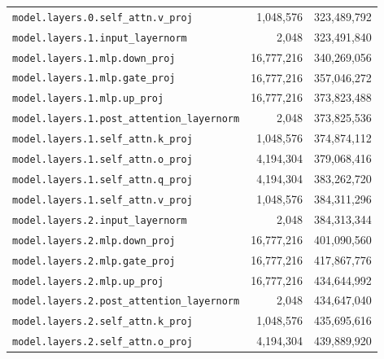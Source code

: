\documentclass[10pt,a4paper]{article}
\theoremstyle{definition}
\begin{document}
\begin{appendices}
\begin{longtable}{p{9.5cm}rr}
\texttt{model.\allowbreak{}layers.\allowbreak{}0.\allowbreak{}self\_attn.\allowbreak{}v\_proj} & 1,048,576 & 323,489,792 \\
\texttt{model.\allowbreak{}layers.\allowbreak{}1.\allowbreak{}input\_layernorm} & 2,048 & 323,491,840 \\
\texttt{model.\allowbreak{}layers.\allowbreak{}1.\allowbreak{}mlp.\allowbreak{}down\_proj} & 16,777,216 & 340,269,056 \\
\texttt{model.\allowbreak{}layers.\allowbreak{}1.\allowbreak{}mlp.\allowbreak{}gate\_proj} & 16,777,216 & 357,046,272 \\
\texttt{model.\allowbreak{}layers.\allowbreak{}1.\allowbreak{}mlp.\allowbreak{}up\_proj} & 16,777,216 & 373,823,488 \\
\texttt{model.\allowbreak{}layers.\allowbreak{}1.\allowbreak{}post\_attention\_layernorm} & 2,048 & 373,825,536 \\
\texttt{model.\allowbreak{}layers.\allowbreak{}1.\allowbreak{}self\_attn.\allowbreak{}k\_proj} & 1,048,576 & 374,874,112 \\
\texttt{model.\allowbreak{}layers.\allowbreak{}1.\allowbreak{}self\_attn.\allowbreak{}o\_proj} & 4,194,304 & 379,068,416 \\
\texttt{model.\allowbreak{}layers.\allowbreak{}1.\allowbreak{}self\_attn.\allowbreak{}q\_proj} & 4,194,304 & 383,262,720 \\
\texttt{model.\allowbreak{}layers.\allowbreak{}1.\allowbreak{}self\_attn.\allowbreak{}v\_proj} & 1,048,576 & 384,311,296 \\
\texttt{model.\allowbreak{}layers.\allowbreak{}2.\allowbreak{}input\_layernorm} & 2,048 & 384,313,344 \\
\texttt{model.\allowbreak{}layers.\allowbreak{}2.\allowbreak{}mlp.\allowbreak{}down\_proj} & 16,777,216 & 401,090,560 \\
\texttt{model.\allowbreak{}layers.\allowbreak{}2.\allowbreak{}mlp.\allowbreak{}gate\_proj} & 16,777,216 & 417,867,776 \\
\texttt{model.\allowbreak{}layers.\allowbreak{}2.\allowbreak{}mlp.\allowbreak{}up\_proj} & 16,777,216 & 434,644,992 \\
\texttt{model.\allowbreak{}layers.\allowbreak{}2.\allowbreak{}post\_attention\_layernorm} & 2,048 & 434,647,040 \\
\texttt{model.\allowbreak{}layers.\allowbreak{}2.\allowbreak{}self\_attn.\allowbreak{}k\_proj} & 1,048,576 & 435,695,616 \\
\texttt{model.\allowbreak{}layers.\allowbreak{}2.\allowbreak{}self\_attn.\allowbreak{}o\_proj} & 4,194,304 & 439,889,920 \\

\end{longtable}
\end{appendices}
\end{document}
